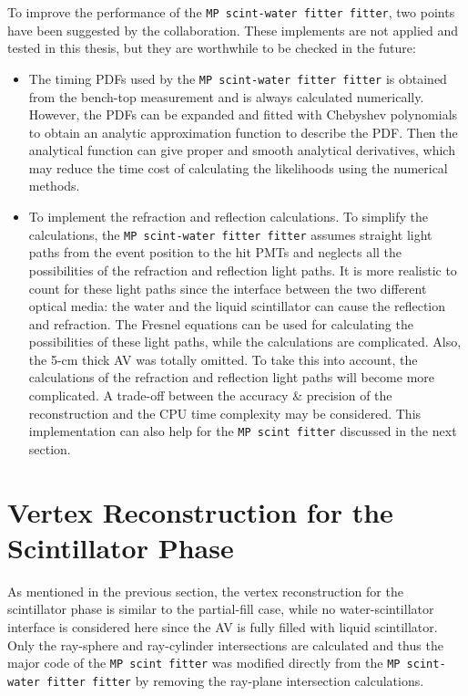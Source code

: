 To improve the performance of the \texttt{MP scint-water fitter fitter}, two points have been suggested by the collaboration. These implements are not applied and tested in this thesis, but they are worthwhile to be checked in the future:
\begin{itemize}
	\item The timing PDFs used by the \texttt{MP scint-water fitter fitter} is obtained from the bench-top measurement and is always calculated numerically. However, the PDFs can be expanded and fitted with Chebyshev polynomials to obtain an analytic approximation function to describe the PDF\cite{press2007numerical}. Then the analytical function can give proper and smooth analytical derivatives, which may reduce the time cost of calculating the likelihoods using the numerical methods.	
	\item To implement the refraction and reflection calculations. To simplify the calculations, the \texttt{MP scint-water fitter fitter} assumes straight light paths from the event position to the hit PMTs and neglects all the possibilities of the refraction and reflection light paths. It is more realistic to count for these light paths since the interface between the two different optical media: the water and the liquid scintillator can cause the reflection and refraction. The Fresnel equations can be used for calculating the possibilities of these light paths\cite{partialWater}, while the calculations are complicated. Also, the 5-cm thick AV was totally omitted. To take this into account, the calculations of the refraction and reflection light paths will become more complicated. A trade-off between the accuracy \& precision of the reconstruction and the CPU time complexity may be considered. This implementation can also help for the \texttt{MP scint fitter} discussed in the next section.
\end{itemize}

\section{Vertex Reconstruction for the Scintillator Phase}\label{sect:scintFitter}
As mentioned in the previous section, the vertex reconstruction for the scintillator phase is similar to the partial-fill case, while no water-scintillator interface is considered here since the AV is fully filled with liquid scintillator. Only the ray-sphere and ray-cylinder intersections are calculated and thus the major code of the \texttt{MP scint fitter} was modified directly from the \texttt{MP scint-water fitter fitter} by removing the ray-plane intersection calculations.

